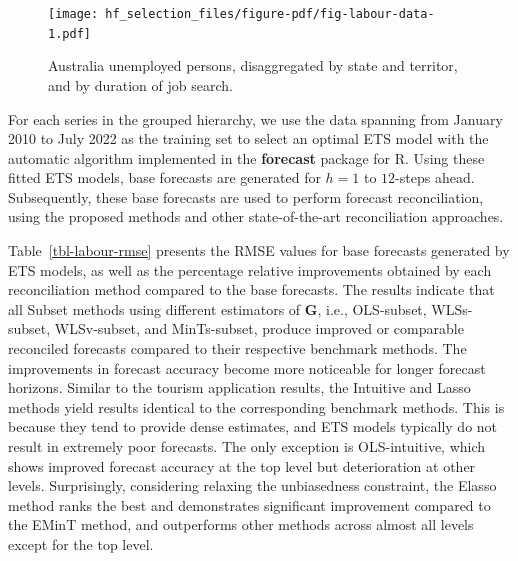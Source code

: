 \documentclass[11pt,a4paper,]{article}
\begin{document}
\begin{figure}

{\centering \texttt{[image: hf\_selection\_files/figure-pdf/fig-labour-data-1.pdf]}

}

\caption{\label{fig-labour-data}Australia unemployed persons,
disaggregated by state and territor, and by duration of job search.}

\end{figure}

For each series in the grouped hierarchy, we use the data spanning from
January 2010 to July 2022 as the training set to select an optimal ETS
model with the automatic algorithm implemented in the \textbf{forecast}
package for R. Using these fitted ETS models, base forecasts are
generated for \(h=1\) to \(12\)-steps ahead. Subsequently, these base
forecasts are used to perform forecast reconciliation, using the
proposed methods and other state-of-the-art reconciliation approaches.

Table~\ref{tbl-labour-rmse} presents the RMSE values for base forecasts
generated by ETS models, as well as the percentage relative improvements
obtained by each reconciliation method compared to the base forecasts.
The results indicate that all Subset methods using different estimators
of \(\boldsymbol{G}\), i.e., OLS-subset, WLSs-subset, WLSv-subset, and
MinTs-subset, produce improved or comparable reconciled forecasts
compared to their respective benchmark methods. The improvements in
forecast accuracy become more noticeable for longer forecast horizons.
Similar to the tourism application results, the Intuitive and Lasso
methods yield results identical to the corresponding benchmark methods.
This is because they tend to provide dense estimates, and ETS models
typically do not result in extremely poor forecasts. The only exception
is OLS-intuitive, which shows improved forecast accuracy at the top
level but deterioration at other levels. Surprisingly, considering
relaxing the unbiasedness constraint, the Elasso method ranks the best
and demonstrates significant improvement compared to the EMinT method,
and outperforms other methods across almost all levels except for the
top level.
\end{document}
